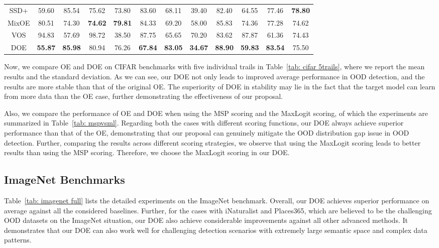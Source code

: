 \documentclass{article} \usepackage{iclr2022_conference,times}
\begin{document}
\begin{table}[t]
{\begin{tabular}{c|cccccccccc|c}
\cellcolor{greyL}SSD+        & \cellcolor{greyL}59.60 & \cellcolor{greyL}85.54 & \cellcolor{greyL}75.62 & \cellcolor{greyL}73.80 & \cellcolor{greyL}83.60 & \cellcolor{greyL}68.11 & \cellcolor{greyL}39.40 & \cellcolor{greyL}82.40 & \cellcolor{greyL}64.55 & \cellcolor{greyL}77.46 & \cellcolor{greyL}\textbf{78.80} \\
MixOE       & 80.51 & 74.30 & \textbf{74.62} & \textbf{79.81} & 84.33 & 69.20 & 58.00 & 85.83 & 74.36 & 77.28 & 74.62 \\
VOS         & 94.83 & 57.69 & 98.72 & 38.50 & 87.75 & 65.65 & 70.20 & 83.62 & 87.87 & 61.36 & 74.43 \\
\hline
DOE         & \textbf{55.87} & \textbf{85.98} & 80.94 & 76.26 & \textbf{67.84} & \textbf{83.05} & \textbf{34.67} & \textbf{88.90} & \textbf{59.83} & \textbf{83.54} & 75.50 \\
\bottomrule[1.5pt]   
\end{tabular}}
\end{table}
 
Now, we compare OE and DOE on CIFAR benchmarks with five individual trails in Table~\ref{tab: cifar 5trails}, where we report the mean results and the standard deviation. As we can see, our DOE not only leads to improved average performance in OOD detection, and the results are more stable than that of the original OE. The superiority of DOE in stability may lie in the fact that the target model can learn from more data than the OE case, further demonstrating the effectiveness of our proposal. 


Also, we compare the performance of OE and DOE when using the MSP scoring and the MaxLogit scoring, of which the experiments are summarized in Table~\ref{tab: mspvsml}. Regarding both the cases with different scoring functions, our DOE always achieve superior performance than that of the OE, demonstrating that our proposal can genuinely mitigate the OOD distribution gap issue in OOD detection. Further, comparing the results across different scoring strategies, we observe that using the MaxLogit scoring leads to better results than using the MSP scoring. Therefore, we choose the MaxLogit scoring in our DOE. 






\subsection{ImageNet Benchmarks}

Table~\ref{tab: imagenet full} lists the detailed experiments on the ImageNet benchmark. Overall, our DOE achieves superior performance on average against all the considered baselines. Further, for the cases with iNaturalist and  Places365, which are believed to be the challenging OOD datasets on the ImageNet situation, our DOE also achieve considerable improvements against all other advanced methods. It demonstrates that our DOE can also work well for challenging detection scenarios with extremely large semantic space and complex data patterns. 
\end{document}
